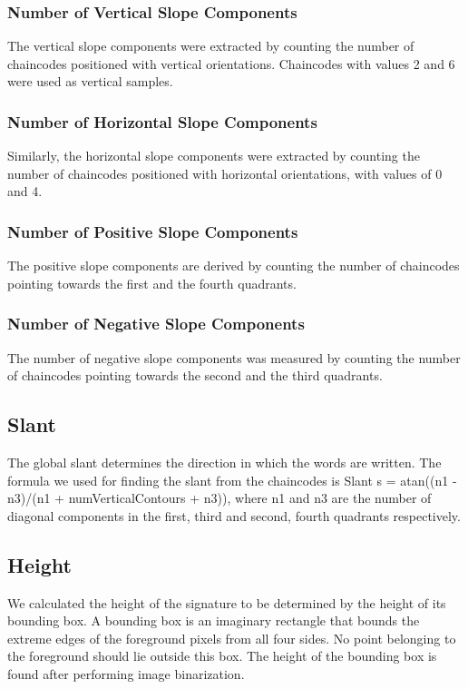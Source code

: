 \documentclass{article}
\begin{document}
\subsubsection{Number of Vertical Slope Components}

The vertical slope components were extracted by counting the number of chaincodes positioned with vertical orientations. Chaincodes with values 2 and 6 were used as vertical samples.

\subsubsection{Number of Horizontal Slope Components}

Similarly, the horizontal slope components were extracted by counting the number of chaincodes positioned with horizontal orientations, with values of 0 and 4.

\subsubsection{Number of Positive Slope Components}

The positive slope components are derived by counting the number of chaincodes pointing towards the first and the fourth quadrants.

\subsubsection{Number of Negative Slope Components}

The number of negative slope components was measured by counting the number of chaincodes pointing towards the second and the third quadrants.

\subsection{Slant}

The global slant determines the direction in which the words are written. The formula we used for finding the slant from the chaincodes is Slant s = atan((n1 - n3)/(n1 + numVerticalContours + n3)), where n1 and n3 are the number of diagonal components in the first, third and second, fourth quadrants respectively.

\subsection{Height}

We calculated the height of the signature to be determined by the height of its bounding box. A bounding box is an imaginary rectangle that bounds the extreme edges of the foreground pixels from all four sides. No point belonging to the foreground should lie outside this box. The height of the bounding box is found after performing image binarization.
\end{document}

